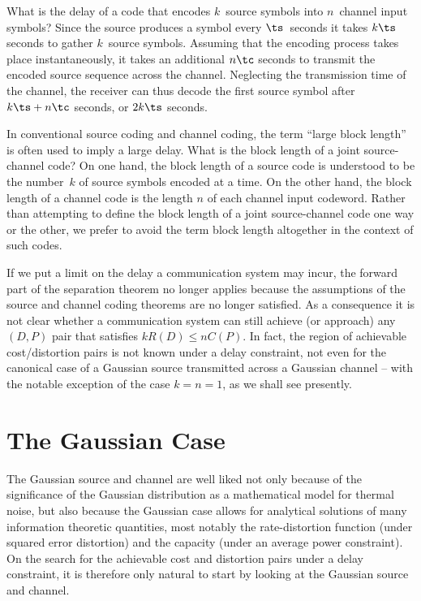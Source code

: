 What is the delay of a code that encodes $k$~source symbols into $n$~channel
input symbols? Since the source produces a symbol every $\ts$~seconds it takes
$k\ts$ seconds to gather $k$~source symbols. Assuming that the encoding process
takes place instantaneously, it takes an additional $n\tc$ seconds to transmit
the encoded source sequence across the channel. Neglecting the transmission time
of the channel, the receiver can thus decode the first source symbol after $k\ts
+ n \tc$ seconds, or $2k\ts$ seconds.

\begin{remark}
  \label{rem:blocklength}
  In conventional source coding and channel coding, the term ``large block
  length'' is often used to imply a large delay. What is the block length of a
  joint source-channel code? On one hand, the block length of a source code is
  understood to be the number~$k$ of source symbols encoded at a time. On the
  other hand, the block length of a channel code is the length $n$ of each
  channel input codeword. Rather than attempting to define the block length of a
  joint source-channel code one way or the other, we prefer to avoid the term
  block length altogether in the context of such codes. 
\end{remark}

If we put a limit on the delay a communication system may incur, the forward
part of the separation theorem no longer applies because the assumptions of the
source and channel coding theorems are no longer satisfied. As a consequence it
is not clear whether a communication system can still achieve (or approach) any
$(D,P)$ pair that satisfies $k R(D) \le n C(P)$. 
In fact, the region of achievable cost/distortion pairs is not known under a
delay constraint, not even for the canonical case of a Gaussian source
transmitted across a Gaussian channel -- with the notable exception of the case
$k=n=1$, as we shall see presently.


\section{The Gaussian Case}

The Gaussian source and channel are well liked not only because of the
significance of the Gaussian distribution as a mathematical model for thermal
noise, but also because the Gaussian case allows for analytical solutions of
many information theoretic quantities, most notably the rate-distortion function
(under squared error distortion) and the capacity (under an average power
constraint). On the search for the achievable cost and distortion pairs under a
delay constraint, it is therefore only natural to start by looking at the
Gaussian source and channel. 

